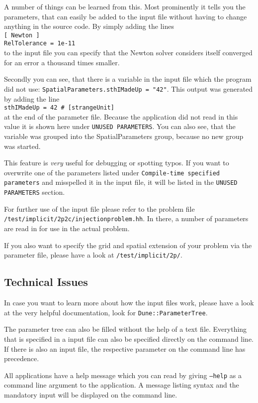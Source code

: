 A number of things can be learned from this. Most prominently it tells you the parameters, that can easily be added to the input file without having to change anything in the source code. 
By simply adding the lines\\
\texttt{[ Newton ]\\
RelTolerance = 1e-11}\\
to the input file you can specify that the Newton solver considers itself converged for an error a thousand times smaller. 

Secondly you can see, that there is a variable in the input  file which the program did not use:
\newline
\texttt{SpatialParameters.sthIMadeUp = "42"}.
\newline 
This output was generated by adding the line \\
\lstinline{sthIMadeUp = 42 # [strangeUnit]}\\
at the end of the parameter file. Because the application did not read in this value it is shown here under \texttt{UNUSED PARAMETERS}. You can also see, that the variable was grouped into the SpatialParameters group, because no new group was started. 

This feature is \emph{very} useful for debugging or spotting typos. If you want to overwrite one of the parameters listed under \texttt{Compile-time specified parameters} and misspelled it in the input file, it will be listed in the  \texttt{UNUSED PARAMETERS} section. 

For further use of the input file please refer to the problem file 
\newline 
\texttt{/test/implicit/2p2c/injectionproblem.hh}.
\newline
In there, a number of parameters are read in for use in the actual problem. 

If you also want to specify  the grid and spatial extension of your problem via the parameter file, please have a look at 
  \newline 
\texttt{/test/implicit/2p/}.
  
\subsection{Technical Issues}
In case you want to learn more about how the input files work, please have a look at the very helpful \Dune documentation, look for \texttt{Dune::ParameterTree}.
  
The parameter tree can also be filled without the help of a text file. Everything that is specified in a \Dumux input file can also be specified directly on the command line. If there is also an input file, the respective parameter on the command line has precedence. 

All applications have a help message which you can read by giving \texttt{--help}   as a command line argument to the application. A message listing syntax and the mandatory input will be displayed on the command line. 
  
  
